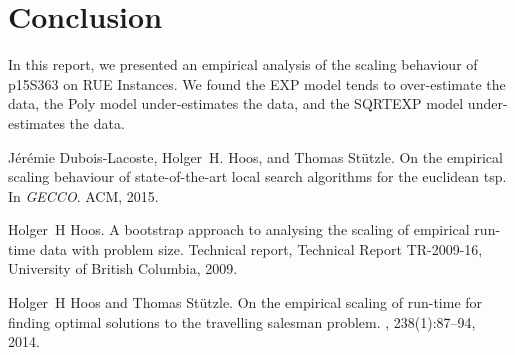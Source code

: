 \section{Conclusion}

In this report, we presented an empirical analysis of the scaling
behaviour of p15S363 on RUE Instances. We found
the EXP model tends to over-estimate the data, the Poly model under-estimates the data, and the SQRTEXP model under-estimates the data.


\begin{thebibliography}{1}

J{\'e}r{\'e}mie Dubois-Lacoste, Holger~H. Hoos, and Thomas St{\"u}tzle.
\newblock On the empirical scaling behaviour of state-of-the-art local search
algorithms for the euclidean tsp.
\newblock In {\em GECCO}. ACM, 2015.

Holger~H Hoos.
\newblock A bootstrap approach to analysing the scaling of empirical run-time
data with problem size.
\newblock Technical report, Technical Report TR-2009-16, University of British
Columbia, 2009.

Holger~H Hoos and Thomas St{\"u}tzle.
\newblock On the empirical scaling of run-time for finding optimal solutions to
the travelling salesman problem.
, 238(1):87--94, 2014.

\end{thebibliography}


